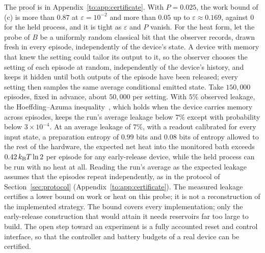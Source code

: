 The proof is in Appendix~\ref{to:app:certificate}. With $P=0.025$, the work bound of (c) is more than $0.87$ at $\varepsilon=10^{-2}$ and more than $0.05$ up to $\varepsilon\approx0.169$, against $0$ for the held process, and it is tight as $\varepsilon$ and $P$ vanish. For the heat form, let the probe of $B$ be a uniformly random classical bit that the observer records, drawn fresh in every episode, independently of the device's state. A device with memory that knew the setting could tailor its output to it, so the observer chooses the setting of each episode at random, independently of the device's history, and keeps it hidden until both outputs of the episode have been released; every setting then samples the same average conditional emitted state. Take $150{,}000$ episodes, fixed in advance, about $50{,}000$ per setting. With $5\%$ observed leakage, the Hoeffding--Azuma inequality~\cite{Hoeffding63,Azuma67}, which holds when the device carries memory across episodes, keeps the run's average leakage below $7\%$ except with probability below $3\times10^{-4}$. At an average leakage of $7\%$, with a readout calibrated for every input state, a preparation entropy of $0.99$ bits and $0.08$ bits of entropy allowed to the rest of the hardware, the expected net heat into the monitored bath exceeds $0.42\,k_{\mathrm B} T\ln2$ per episode for any early-release device, while the held process can be run with no heat at all. Reading the run's average as the expected leakage assumes that the episodes repeat independently, as in the protocol of Section~\ref{sec:protocol} (Appendix~\ref{to:app:certificate}). The measured leakage certifies a lower bound on work or heat on this probe; it is not a reconstruction of the implemented strategy. The bound covers every implementation; only the early-release construction that would attain it needs reservoirs far too large to build. The open step toward an experiment is a fully accounted reset and control interface, so that the controller and battery budgets of a real device can be certified.

